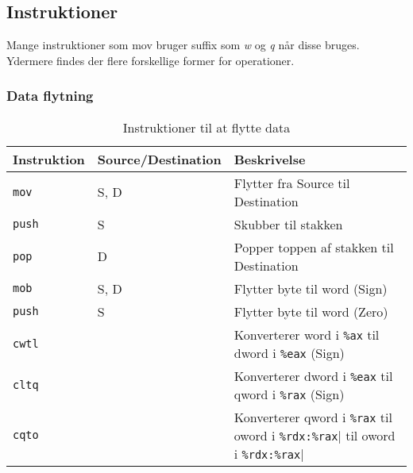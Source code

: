 \subsection{Instruktioner}
Mange instruktioner som mov bruger suffix som \textit{w} og \textit{q} når disse bruges.
Ydermere findes der flere forskellige former for operationer.
\subsubsection{Data flytning}
\begin{table}[h!]
    \centering
    \begin{tabular}{ll|l}
        Instruktion&Source/Destination&Beskrivelse\\\hline
        \verb|mov|&S, D&Flytter fra Source til Destination\\
        \verb|push|&S&Skubber til stakken\\
        \verb|pop|&D&Popper toppen af stakken til Destination\\\hline
        \verb|mob|&S, D&Flytter byte til word (Sign)\\
        \verb|push|&S&Flytter byte til word (Zero)\\\hline
        \verb|cwtl|&&Konverterer word i \verb|%ax| til dword i \verb|%eax| (Sign)\\
        \verb|cltq|&&Konverterer dword i \verb|%eax| til qword i \verb|%rax| (Sign)\\
        \verb|cqto|&&Konverterer qword i \verb|%rax| til oword i \verb|%rdx:%rax|
    \end{tabular}
    \caption{Instruktioner til at flytte data}
\end{table}
